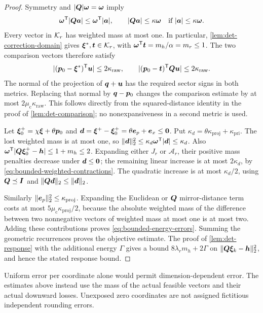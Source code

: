 \begin{proof}
Symmetry and $|\bm{Q}|\bm{\omega}=\bm{\omega}$ imply
\begin{equation}
 \bm{\omega}^{\mathsf{T}}|\bm{Q}\bm{a}|\leq\bm{\omega}^{\mathsf{T}}|\bm{a}|,
 \qquad |\bm{Q}\bm{a}|\leq\kappa\bm{\omega}
       \quad\hbox{if }|\bm{a}|\leq\kappa\bm{\omega}.
 \label{eq:bounded-weighted-contractions}
\end{equation}
Every vector in $\mathcal{K}_r$ has weighted mass at most one. In particular,
\cref{lem:det-correction-domain} gives $\bm{\xi}^*,\bm{t}\in\mathcal{K}_r$, with
$\bm{\omega}^{\mathsf{T}}\bm{t}=m_h/\alpha=m_r\leq1$.
The two comparison vectors therefore satisfy
\[
 |(\bm{p}_0-\bm{\xi}^*)^{\mathsf{T}}\bm{u}|\leq2\kappa_{\mathrm{raw}},
 \qquad
 |(\bm{p}_0-\bm{t})^{\mathsf{T}}\bm{Q}\bm{u}|\leq2\kappa_{\mathrm{raw}}.
\]
The normal of the projection of $\bm{q}+\bm{u}$ has the required sector
signs in both metrics. Replacing that normal by $\bm{q}-\bm{p}_0$ changes
the comparison estimate by at most $2\mu_{\mathrm{c}}\kappa_{\mathrm{raw}}$.
This follows directly from the squared-distance identity in the proof of
\cref{lem:det-comparison}; no nonexpansiveness in a second metric is used.

Let $\bm{\xi}_0^+=\chi\bm{\xi}+\theta\bm{p}_0$ and
$\bm{d}=\bm{\xi}^+-\bm{\xi}_0^+=\theta\bm{e}_p+\bm{e}_x\leq\bm{0}$.
Put $\kappa_d=\theta\kappa_{\mathrm{proj}}+\kappa_{\mathrm{pri}}$.
The lost weighted mass is at most one, so
$\lVert\bm{d}\rVert_2^2\leq\kappa_d\bm{\omega}^{\mathsf{T}}|\bm{d}|\leq\kappa_d$.
Also
$\bm{\omega}^{\mathsf{T}}|\bm{Q}\bm{\xi}_0^+-\bm{h}|\leq1+m_h\leq2$.
Expanding either $J_r$ or $\mathcal A_r$, their positive mass penalties
decrease under $\bm{d}\leq\bm{0}$; the remaining linear increase is at
most $2\kappa_d$, by \cref{eq:bounded-weighted-contractions}.
The quadratic increase is at most $\kappa_d/2$, using
$\bm{Q}\preceq\bm{I}$ and $\lVert\bm{Q}\bm{d}\rVert_2\leq\lVert\bm{d}\rVert_2$.

Similarly $\lVert\bm{e}_p\rVert_2^2\leq\kappa_{\mathrm{proj}}$.
Expanding the Euclidean or $\bm{Q}$ mirror-distance term costs at most
$5\mu_{\mathrm{c}}\kappa_{\mathrm{proj}}/2$, because the absolute weighted mass
of the difference between two nonnegative vectors of weighted mass at most
one is at most two.
Adding these contributions proves \cref{eq:bounded-energy-errors}.
Summing the geometric recurrences proves the objective estimate.
The proof of \cref{lem:det-response} with the additional energy $\Gamma$
gives a bound $8\lambda_r m_h+2\Gamma$ on
$\lVert\bm{Q}\bm{\xi}_k-\bm{h}\rVert_2^2$, and hence the stated response bound.
\end{proof}

Uniform error per coordinate alone would permit dimension-dependent error.
The estimates above instead use the mass of the actual feasible vectors
and their actual downward losses. Unexposed zero coordinates are not
assigned fictitious independent rounding errors.

